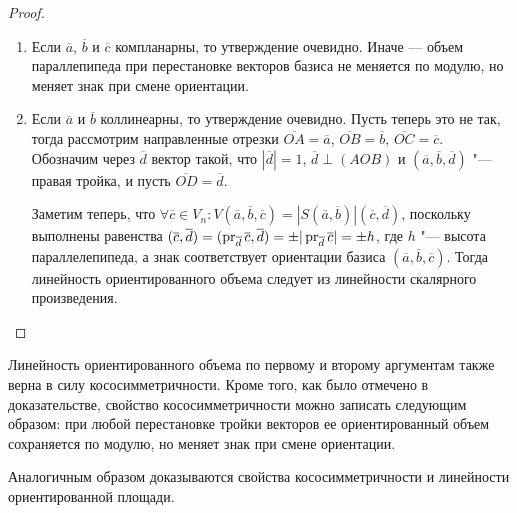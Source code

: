 \begin{proof}~
	\begin{enumerate}
		\item Если $\overline{a}$, $\overline{b}$ и $\overline{c}$ компланарны, то утверждение очевидно. Иначе --- объем параллепипеда при перестановке векторов базиса не меняется по модулю, но меняет знак при смене ориентации.
		\item Если $\overline{a}$ и $\overline{b}$ коллинеарны, то утверждение очевидно. Пусть теперь это не так, тогда рассмотрим направленные отрезки $\overline{OA} = \overline{a}$, $\overline{OB} = \overline{b}$, $\overline{OC} = \overline{c}$. Обозначим через $\overline d$ вектор такой, что $|\overline{d}| = 1$, $\overline{d} \perp (AOB)$ и $(\overline{a}, \overline{b}, \overline{d})$ "--- правая тройка, и пусть $\overline{OD} = \overline{d}$.
		
		Заметим теперь, что $\forall \overline{c} \in V_n: V(\overline{a}, \overline{b}, \overline{c}) = |S(\overline{a}, \overline{b})|(\overline{c}, \overline{d})$, поскольку выполнены равенства $(\overline{c}, \overline{d}) = (\pr_{\overline{d}}\overline{c}, \overline{d}) \hm{=} \pm |\pr_{\overline{d}}\overline{c}| = \pm h$, где $h$ "--- высота параллелепипеда, а знак соответствует ориентации базиса $(\overline{a}, \overline{b}, \overline{c})$. Тогда линейность ориентированного объема следует из линейности скалярного произведения.\qedhere
	\end{enumerate}
\end{proof}

\begin{note}
	Линейность ориентированного объема по первому и второму аргументам также верна в силу кососимметричности. Кроме того, как было отмечено в доказательстве, свойство кососимметричности можно записать следующим образом: при любой перестановке тройки векторов ее ориентированный объем сохраняется по модулю, но меняет знак при смене ориентации.
\end{note}

\begin{note}
	Аналогичным образом доказываются свойства кососимметричности и линейности ориентированной площади.
\end{note}


